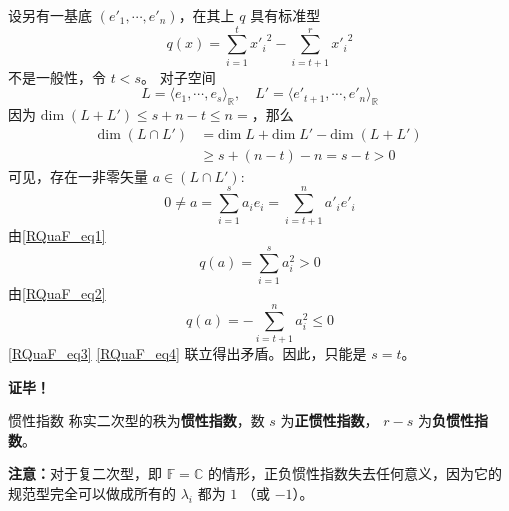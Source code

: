 设另有一基底 $( e'_1,\cdots, e'_n)$，在其上 $q$ 具有标准型
\begin{equation}\label{RQuaF_eq2}
q( x)=\sum_{i=1}^{t}{x'_i}^2-\sum_{i=t+1}^{r} {x'_{i}}^{2}
\end{equation}
不是一般性，令 $t<s$。
对子空间
\begin{equation}
L=\langle  e_1,\cdots, e_s\rangle_\mathbb{R},\quad L'=\langle  e'_{t+1},\cdots, e'_n\rangle_\mathbb{R}
\end{equation}
因为 $\mathrm{dim}\;(L+L')\leq s+n-t\leq n=$，那么
\begin{equation}
\begin{aligned}
\mathrm{dim}\;(L\cap L')&=\mathrm{dim}\; L+\mathrm{dim}\; L'-\mathrm{dim}\;(L+L')\\
&\geq s+(n-t)-n=s-t> 0
\end{aligned}
\end{equation}
可见，存在一非零矢量 $ a\in(L\cap L')$:
\begin{equation}
 0\neq a=\sum_{i=1}^s a_i e_i=\sum_{i=t+1}^n a'_i  e'_i
\end{equation}
由\autoref{RQuaF_eq1} 
\begin{equation}\label{RQuaF_eq3}
q( a)=\sum_{i=1}^s a_i^2>0
\end{equation}
由\autoref{RQuaF_eq2} 
\begin{equation}\label{RQuaF_eq4}
q( a)=-\sum_{i=t+1}^n a_i^2\leq 0
\end{equation}
\autoref{RQuaF_eq3} \autoref{RQuaF_eq4} 联立得出矛盾。因此，只能是 $s=t$。

\textbf{证毕！}
\begin{definition}{惯性指数}\label{RQuaF_def1}
称实二次型的秩为\textbf{惯性指数}，数 $s$ 为\textbf{正惯性指数}， $r-s$ 为\textbf{负惯性指数}。
\end{definition}

\textbf{注意：}对于复二次型，即 $\mathbb F=\mathbb C$ 的情形，正负惯性指数失去任何意义，因为它的规范型完全可以做成所有的 $\lambda_i$ 都为 $1$ （或 $-1$）。